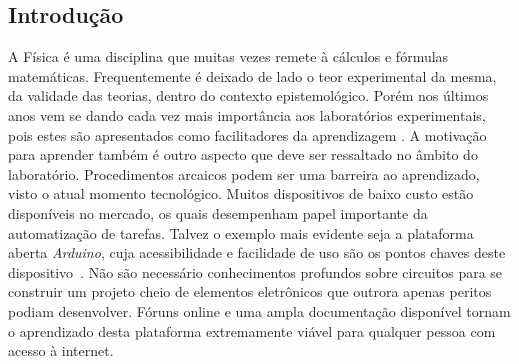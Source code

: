\documentclass[portrait,a0]{a0poster}
\begin{document}
\begin{multicols}{2} %


%
%


\color{SaddleBrown} %

\section*{Introdução}

A Física é uma disciplina que muitas vezes remete à cálculos e fórmulas matemáticas.
Frequentemente é deixado de lado o teor experimental da mesma, da validade das teorias, dentro do contexto epistemológico.
Porém nos últimos anos vem se dando cada vez mais importância aos laboratórios experimentais, pois estes são apresentados como facilitadores da aprendizagem
\cite{Grandini_2004, RodriguesCunha2014}.
A motivação para aprender também é outro aspecto que deve ser ressaltado no âmbito do laboratório.
Procedimentos arcaicos podem ser uma barreira ao aprendizado, visto o atual momento tecnológico.
Muitos dispositivos de baixo custo estão disponíveis no mercado, os quais desempenham papel importante da automatização de tarefas.
Talvez o exemplo mais evidente seja a plataforma aberta \emph{Arduino}, cuja acessibilidade e facilidade de uso são os pontos chaves deste dispositivo~\cite{OliveiraZanetti2015}.
Não são necessário conhecimentos profundos sobre circuitos para se construir um projeto cheio de elementos eletrônicos que outrora apenas peritos podiam desenvolver.
Fóruns online e uma ampla documentação disponível tornam o aprendizado desta plataforma extremamente viável para qualquer pessoa com acesso à internet.



\end{multicols}
\end{document}
